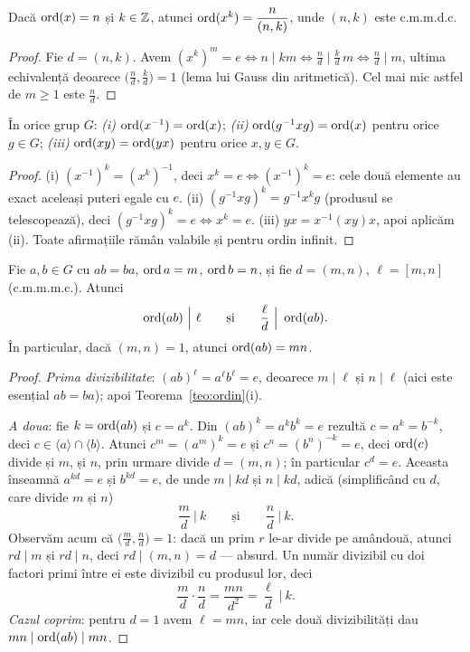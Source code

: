 \begin{propozitie}\label{prop:ordputere}
Dacă $\operatorname{ord}(x)=n$ și $k\in\mathbb{Z}$, atunci $\operatorname{ord}(x^k)=\dfrac{n}{(n,k)}$, unde $(n,k)$ este c.m.m.d.c.
\end{propozitie}

\begin{proof}
Fie $d=(n,k)$. Avem $(x^k)^m=e\iff n\mid km\iff \frac{n}{d}\mid \frac{k}{d}\,m\iff \frac{n}{d}\mid m$, ultima echivalență deoarece $\bigl(\frac{n}{d},\frac{k}{d}\bigr)=1$ (lema lui Gauss din aritmetică). Cel mai mic astfel de $m\ge1$ este $\frac{n}{d}$.
\end{proof}

\begin{propozitie}\label{prop:ordinv}
În orice grup $G$: \emph{(i)} $\operatorname{ord}(x^{-1})=\operatorname{ord}(x)$; \emph{(ii)} $\operatorname{ord}(g^{-1}xg)=\operatorname{ord}(x)$ pentru orice $g\in G$; \emph{(iii)} $\operatorname{ord}(xy)=\operatorname{ord}(yx)$ pentru orice $x,y\in G$.
\end{propozitie}

\begin{proof}
(i) $(x^{-1})^k=(x^k)^{-1}$, deci $x^k=e\iff(x^{-1})^k=e$: cele două elemente au exact aceleași puteri egale cu $e$. (ii) $(g^{-1}xg)^k=g^{-1}x^kg$ (produsul se telescopează), deci $(g^{-1}xg)^k=e\iff x^k=e$. (iii) $yx=x^{-1}(xy)x$, apoi aplicăm (ii). Toate afirmațiile rămân valabile și pentru ordin infinit.
\end{proof}

\begin{teorema}\label{teo:ordprodus}
Fie $a,b\in G$ cu $ab=ba$, $\operatorname{ord} a=m$, $\operatorname{ord} b=n$, și fie $d=(m,n)$, $\ell=[m,n]$ (c.m.m.m.c.). Atunci
\[
\operatorname{ord}(ab)\ \Big|\ \ell
\qquad\text{și}\qquad
\frac{\ell}{d}\ \Big|\ \operatorname{ord}(ab).
\]
În particular, dacă $(m,n)=1$, atunci $\operatorname{ord}(ab)=mn$.
\end{teorema}

\begin{proof}
\emph{Prima divizibilitate}: $(ab)^{\ell}=a^{\ell}b^{\ell}=e$, deoarece $m\mid\ell$ și $n\mid\ell$ (aici este esențial $ab=ba$); apoi Teorema~\ref{teo:ordin}(i).

\emph{A doua}: fie $k=\operatorname{ord}(ab)$ și $c=a^k$. Din $(ab)^k=a^kb^k=e$ rezultă $c=a^k=b^{-k}$, deci $c\in\langle a\rangle\cap\langle b\rangle$. Atunci $c^m=(a^m)^k=e$ și $c^n=(b^n)^{-k}=e$, deci $\operatorname{ord}(c)$ divide și $m$, și $n$, prin urmare divide $d=(m,n)$; în particular $c^d=e$. Aceasta înseamnă $a^{kd}=e$ și $b^{kd}=e$, de unde $m\mid kd$ și $n\mid kd$, adică (simplificând cu $d$, care divide $m$ și $n$)
\[
\frac md\ \Big|\ k\qquad\text{și}\qquad\frac nd\ \Big|\ k.
\]
Observăm acum că $\bigl(\frac md,\frac nd\bigr)=1$: dacă un prim $r$ le-ar divide pe amândouă, atunci $rd\mid m$ și $rd\mid n$, deci $rd\mid(m,n)=d$ --- absurd. Un număr divizibil cu doi factori primi între ei este divizibil cu produsul lor, deci
\[
\frac md\cdot\frac nd=\frac{mn}{d^2}=\frac{\ell}{d}\ \Big|\ k.
\]
\emph{Cazul coprim}: pentru $d=1$ avem $\ell=mn$, iar cele două divizibilități dau $mn\mid\operatorname{ord}(ab)\mid mn$.
\end{proof}

